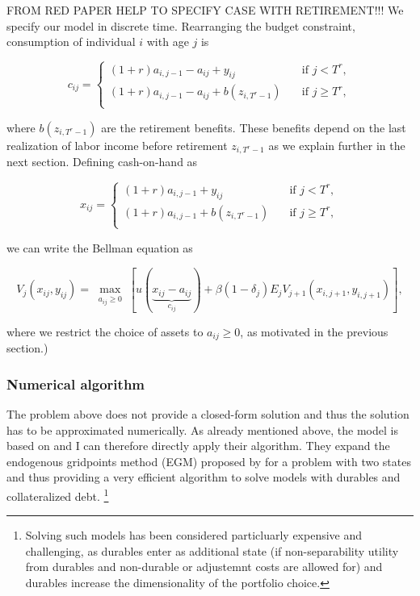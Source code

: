 \documentclass[a4paper,12pt]{article}
\begin{document}
FROM RED PAPER HELP TO SPECIFY CASE WITH RETIREMENT!!!
We specify our model in discrete time. Rearranging the budget constraint, consumption of individual $i$ with age $j$ is 

\begin{equation}
c_{ij} = 
  \begin{cases}
    (1+r)a_{i,j-1}-a_{ij}+y_{ij} & \quad \text{if } j < T^{r}, \\
    (1+r)a_{i,j-1}-a_{ij}+b(z_{i,T^{r}-1}) & \quad \text{if } j \geq T^{r},\\
  \end{cases}
\end{equation}

where $b(z_{i,T^{r}-1})$ are the retirement benefits. These benefits depend on the last realization of labor income before retirement $z_{i,T^{r}-1}$ as we explain further in the next section. Defining cash-on-hand as 

\begin{equation}
x_{ij} = 
  \begin{cases}
    (1+r)a_{i,j-1}+y_{ij} & \quad \text{if } j < T^{r}, \\
    (1+r)a_{i,j-1}+b(z_{i,T^{r}-1}) & \quad \text{if } j \geq T^{r},\\
  \end{cases}
\end{equation}

we can write the Bellman equation as 

\begin{equation}
V_{j}(x_{ij},y_{ij})= \max_{ \substack{a_{ij} \geq 0}}[u(\underbrace{x_{ij}-a_{ij}}_{c_{ij}}) + \beta(1-\delta_{j})E_{j}V_{j+1}(x_{i,j+1},y_{i,j+1})],
\end{equation}

where we restrict the choice of assets to $a_{ij} \geq 0$, as motivated in the previous section.)

\subsubsection{Numerical algorithm}

The problem above does not provide a closed-form solution and thus the solution has to be approximated numerically. As already mentioned above, the model is based on \cite{hintermaier2010} and I can therefore directly apply their algorithm. They expand the endogenous gridpoints method (EGM) proposed by \cite{carroll2006} for a problem with two states and thus providing a very efficient algorithm to solve models with durables and collateralized debt. \footnote{Solving such models has been considered particluarly expensive and challenging, as durables enter as additional state (if non-separability utility from durables and non-durable or adjustemnt costs are allowed for) and durables increase the dimensionality of the portfolio choice.\citep{hintermaier2010}} 
\end{document}
